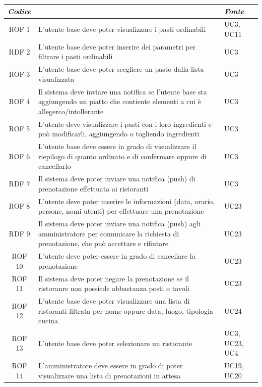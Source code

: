 \documentclass[12pt, oneside]{article}
\begin{document}
\begin{longtable}{|c|p{14cm}|p{2cm}|}
    \hline
    \emph{Codice} & \centering{\emph{Descrizione}} &  \emph{Fonte} \\
    \hline
    \endfirsthead
    \endhead
    ROF 1 & L'utente base deve poter visualizzare i pasti ordinabili & UC3, UC11\\
    \hline
    RDF 2 & L'utente base deve poter inserire dei parametri per filtrare i pasti ordinabili  & UC3 \\
    \hline
    ROF 3 & L'utente base deve poter scegliere un pasto dalla lista visualizzata & UC3 \\
    \hline
    ROF 4 & Il sistema deve inviare una notifica se l'utente base sta aggiungendo un piatto che contiente elementi a cui è allegerco/intollerante & UC3\\
    \hline
    ROF 5 & L'utente deve visualizzare i pasti con i loro ingredienti e può modificarli, aggiungendo o togliendo ingredienti & UC3\\
    \hline
    ROF 6 & L'utente base deve essere in grado di visualizzare il riepilogo di quanto ordinato e di confermare oppure di cancellarlo & UC3 \\
    \hline
    RDF 7 & Il sistema deve poter inviare una notifica (push) di prenotazione effettuata ai ristoranti& UC3 \\
    \hline
    ROF 8 & L'utente deve poter inserire le informazioni (data, orario, persone, nomi utenti) per effettuare una prenotazione & UC23\\
    \hline
    RDF 9 & Il sistema deve poter inviare una notifica (push) agli amministratore per comunicare la richiesta di prenotazione, che può accettare e rifiutare & UC23\\
    \hline
    ROF 10 & L'utente deve poter essere in grado di cancellare la prenotazione & UC23 \\
    \hline
    ROF 11 & Il sistema deve poter negare la prenotazione se il ristoranre non possiede abbastanza posti o tavoli & UC23 \\
    \hline
    ROF 12 & L'utente base deve poter visualizzare una lista di ristoranti filtrata per nome oppure data, luogo, tipologia cucina & UC24 \\
    \hline
    ROF 13 & L'utente base deve poter selezionare un ristorante  & UC3, UC23, UC4\\
    \hline
    ROF 14 & L'amministratore deve essere in grado di poter visualizzare una lista di prenotazioni in attesa & UC19, UC20 \\

\end{longtable}
\end{document}

